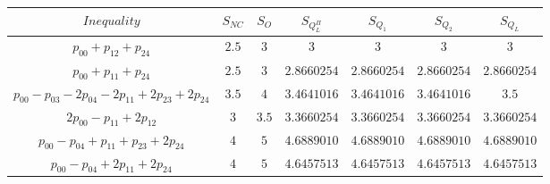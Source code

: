 \documentclass{article}
\begin{document}
\begin{table}[]
\begin{tabular}{c|c|c|c|c|c|c}
\rowcolor{lightgray} $Inequality$ & $S_{NC}$ & $S_{O}$ & $S_{Q^{\Pi}_L}$  & $S_{Q_1}$ & $S_{Q_2}$  & $S_{Q_L}$ \\ \hline
$p_{00} +p_{12} +p_{24} $                                &$2.5$ &$3$  &$3$        &$3$        &$3$        &$3$ \\ \hline
$p_{00} +p_{11} +p_{24}$                                 &$2.5$ &$3$  &$2.8660254$&$2.8660254$&$2.8660254$ &$2.8660254$  \\ \hline \rowcolor{green} 
$p_{00} -p_{03} - 2 p_{04}-2 p_{11} +2 p_{23} +2 p_{24}$ &$3.5$ &$4$  &$3.4641016$&$3.4641016$&$3.4641016$ &$3.5$  \\  \hline
$2p_{00} - p_{11} + 2 p_{12}$                            &$3$   &$3.5$&$3.3660254$&$3.3660254$&$3.3660254$ &$3.3660254$  \\  \hline
$p_{00}  - p_{04} +   p_{11} + p_{23} +2 p_{24}$         &$4$   &$5$  &$4.6889010$&$4.6889010$&$4.6889010$ &$4.6889010$  \\  \hline
$p_{00}  - p_{04} +   2p_{11}  +2 p_{24}$                &$4$   &$5$  &$4.6457513$&$4.6457513$&$4.6457513$ &$4.6457513$  \\ 
\end{tabular}
\end{table}
\end{document}
